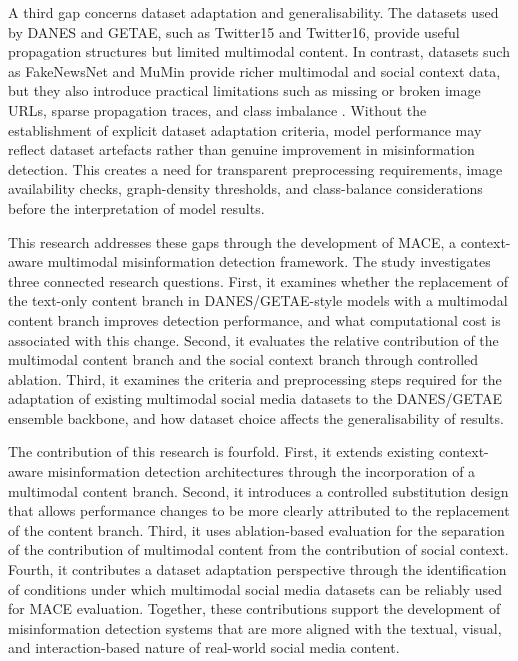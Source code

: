 A third gap concerns dataset adaptation and generalisability. The datasets used by DANES and GETAE, such as Twitter15 and Twitter16, provide useful propagation structures but limited multimodal content. In contrast, datasets such as FakeNewsNet and MuMin provide richer multimodal and social context data, but they also introduce practical limitations such as missing or broken image URLs, sparse propagation traces, and class imbalance \citep{shu2020fakenewsnet,mumindataset}. Without the establishment of explicit dataset adaptation criteria, model performance may reflect dataset artefacts rather than genuine improvement in misinformation detection. This creates a need for transparent preprocessing requirements, image availability checks, graph-density thresholds, and class-balance considerations before the interpretation of model results.

This research addresses these gaps through the development of MACE, a context-aware multimodal misinformation detection framework. The study investigates three connected research questions. First, it examines whether the replacement of the text-only content branch in DANES/GETAE-style models with a multimodal content branch improves detection performance, and what computational cost is associated with this change. Second, it evaluates the relative contribution of the multimodal content branch and the social context branch through controlled ablation. Third, it examines the criteria and preprocessing steps required for the adaptation of existing multimodal social media datasets to the DANES/GETAE ensemble backbone, and how dataset choice affects the generalisability of results.

The contribution of this research is fourfold. First, it extends existing context-aware misinformation detection architectures through the incorporation of a multimodal content branch. Second, it introduces a controlled substitution design that allows performance changes to be more clearly attributed to the replacement of the content branch. Third, it uses ablation-based evaluation for the separation of the contribution of multimodal content from the contribution of social context. Fourth, it contributes a dataset adaptation perspective through the identification of conditions under which multimodal social media datasets can be reliably used for MACE evaluation. Together, these contributions support the development of misinformation detection systems that are more aligned with the textual, visual, and interaction-based nature of real-world social media content.


